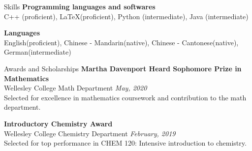 \documentclass{resume}
\begin{document}
\begin{rSection}{Skills}
{\bf Programming languages and softwares}
\\C++ (proficient), \LaTeX (proficient), Python (intermediate), Java (intermediate)

{\bf Languages}
\\English(proficient), Chinese - Mandarin(native), Chinese - Cantonese(native), German(intermediate)\\ 
\end{rSection}




\begin{rSection}{Awards and Scholarships} 
{\bf Martha Davenport Heard Sophomore Prize in Mathematics}\\{Wellesley College Math Department
} \hfill{\em May, 2020}
\\Selected for excellence in mathematics coursework and contribution to the math department.

{\bf Introductory Chemistry Award}\\{Wellesley College Chemistry Department
} \hfill{\em February, 2019}
\\Selected for top performance in CHEM 120: Intensive introduction to chemistry.

\end{rSection}
\end{document}
